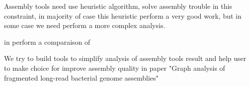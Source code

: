\documentclass[./main.tex]{subfiles}
\begin{document}
Assembly tools need use heuristic algorithm, solve assembly trouble in this constraint, in majority of case this heuristic perform a very good work, but in some case we need perform a more complex analysis.

\citeauthor{long_read_assembler_comparison} in \cite{long_read_assembler_comparison} perform a comparaison of 

We try to build tools to simplify analysis of assembly tools result and help user to make choice for improve assembly quality in paper "Graph analysis of fragmented long-read bacterial genome assemblies"

\end{document}
